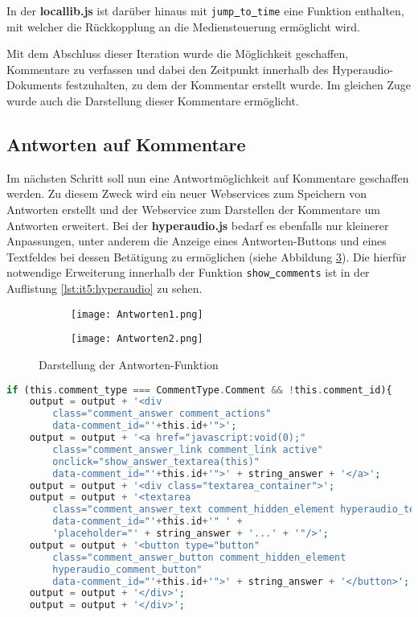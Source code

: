 In der \textbf{locallib.js} ist darüber hinaus mit \texttt{jump\underline{{ }}to\underline{{ }}time} eine Funktion enthalten, mit welcher die Rückkopplung an die Mediensteuerung ermöglicht wird.

Mit dem Abschluss dieser Iteration wurde die Möglichkeit geschaffen, Kommentare zu verfassen und dabei den Zeitpunkt innerhalb des Hyperaudio-Dokuments festzuhalten, zu dem der Kommentar erstellt wurde. Im gleichen Zuge wurde auch die Darstellung dieser Kommentare ermöglicht.

\subsection{Antworten auf Kommentare}
Im nächsten Schritt soll nun eine Antwortmöglichkeit auf Kommentare geschaffen werden. Zu diesem Zweck wird ein neuer Webservices zum Speichern von Antworten erstellt und der Webservice zum Darstellen der Kommentare um Antworten erweitert. Bei der \textbf{hyperaudio.js} bedarf es ebenfalls nur kleinerer Anpassungen, unter anderem die Anzeige eines Antworten-Buttons und eines Textfeldes bei dessen Betätigung zu ermöglichen (siehe Abbildung \ref{fig:Antworten}). Die hierfür notwendige Erweiterung innerhalb der Funktion \texttt{show\underline{{ }}comments} ist in der Auflistung \ref{lst:it5:hyperaudio} zu sehen.

\begin{figure}[h!]
\begin{subfigure}[c]{0.5\textwidth}
\texttt{[image: Antworten1.png]}
\label{fig:Antworten1}
\end{subfigure}%
\begin{subfigure}[c]{0.5\textwidth}
\texttt{[image: Antworten2.png]}
\label{fig:Antworten2}
\end{subfigure}
\caption{Darstellung der Antworten-Funktion}
\label{fig:Antworten}
\end{figure}

\begin{lstlisting}[language=php,
             linewidth=\textwidth,
             caption={Ausschnitt der \textbf{hyperaudio.js} in der 5. Iteration},
             label={lst:it5:hyperaudio}]
if (this.comment_type === CommentType.Comment && !this.comment_id){
    output = output + '<div 
        class="comment_answer comment_actions" 
        data-comment_id="'+this.id+'">';
    output = output + '<a href="javascript:void(0);"
        class="comment_answer_link comment_link active" 
        onclick="show_answer_textarea(this)" 
        data-comment_id="'+this.id+'">' + string_answer + '</a>';
    output = output + '<div class="textarea_container">';
    output = output + '<textarea 
        class="comment_answer_text comment_hidden_element hyperaudio_textarea" 
        data-comment_id="'+this.id+'" ' + 
        'placeholder="' + string_answer + '...' + '"/>';
    output = output + '<button type="button" 
        class="comment_answer_button comment_hidden_element
        hyperaudio_comment_button" 
        data-comment_id="'+this.id+'">' + string_answer + '</button>';
    output = output + '</div>';
    output = output + '</div>';
\end{lstlisting}

